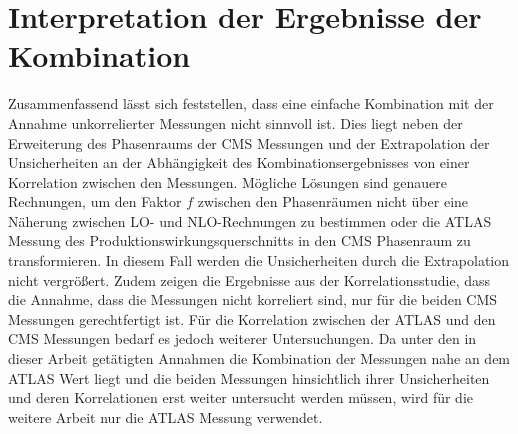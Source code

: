\section{Interpretation der Ergebnisse der Kombination}
Zusammenfassend lässt sich feststellen, dass eine einfache Kombination mit der Annahme unkorrelierter Messungen nicht sinnvoll ist. Dies liegt neben der Erweiterung des Phasenraums der CMS Messungen und der Extrapolation der Unsicherheiten an der Abhängigkeit des Kombinationsergebnisses von einer Korrelation zwischen den Messungen.
Mögliche Lösungen sind genauere Rechnungen, um den Faktor $f$ zwischen den Phasenräumen nicht über eine Näherung zwischen LO- und NLO-Rechnungen zu bestimmen oder die ATLAS Messung des Produktionswirkungsquerschnitts in den CMS Phasenraum zu transformieren. In diesem Fall werden die Unsicherheiten durch die Extrapolation nicht vergrößert.
Zudem zeigen die Ergebnisse aus der Korrelationsstudie, dass die Annahme, dass die Messungen nicht korreliert sind, nur für die beiden CMS Messungen gerechtfertigt ist. Für die Korrelation zwischen der ATLAS und den CMS Messungen bedarf es jedoch weiterer Untersuchungen.
Da unter den in dieser Arbeit getätigten Annahmen die Kombination der Messungen nahe an dem ATLAS Wert liegt und die beiden Messungen hinsichtlich ihrer Unsicherheiten und deren Korrelationen erst weiter untersucht werden müssen, wird für die weitere Arbeit nur die ATLAS Messung verwendet.
%
%

